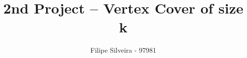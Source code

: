 \documentclass[...]{revdetua}
\begin{document}

\title{2nd Project – Vertex Cover of size k}
\author{Filipe Silveira - 97981} %
\maketitle














\end{document}
